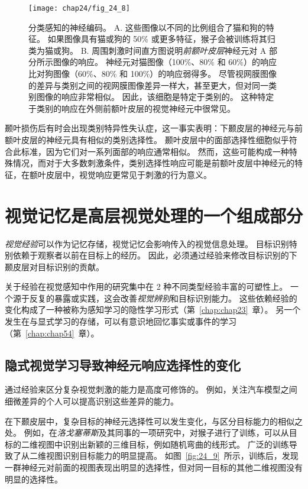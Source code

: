 \begin{figure}[htbp]
	\centering
	\texttt{[image: chap24/fig\_24\_8]}
	\caption{分类感知的神经编码。
		A. 这些图像以不同的比例组合了猫和狗的特征。
		如果图像具有猫或狗的 50\% 或更多特征，猴子会被训练将其归类为猫或狗。
		B. 周围刺激时间直方图说明\textit{前额叶皮层}神经元对 A 部分所示图像的响应。
		神经元对猫图像（100\%、80\% 和 60\%）的响应比对狗图像（60\%、80\% 和 100\%）的响应弱得多。
		尽管视网膜图像的差异与类别之间的视网膜图像差异一样大，甚至更大，但对同一类别图像的响应非常相似。
		因此，该细胞是特定于类别的。
		这种特定于类别的响应在外侧前额叶皮层的视觉神经元中很常见。}
	\label{fig:24_8}
\end{figure}


颞叶损伤后有时会出现类别特异性失认症，这一事实表明：下颞皮层的神经元与前额叶皮层的神经元具有相似的类别选择性。
颞叶皮层中的面部选择性细胞似乎符合此标准，因为它们对一系列面部的响应通常相似。
然而，这些可能构成一种特殊情况，而对于大多数刺激条件，类别选择性响应可能是前额叶皮层中神经元的特征，在额叶皮层中，视觉响应更常见于刺激的行为意义。



\section{视觉记忆是高层视觉处理的一个组成部分}

\textit{视觉经验}可以作为记忆存储，视觉记忆会影响传入的视觉信息处理。
目标识别特别依赖于观察者以前在目标上的经历。
因此，必须通过经验来修改目标识别的下颞皮层对目标识别的贡献。


关于经验在视觉感知中作用的研究集中在 2 种不同类型经验丰富的可塑性上。
一个源于反复的暴露或实践，这会改善\textit{视觉辨别}和目标识别能力。
这些依赖经验的变化构成了一种被称为感知学习的隐性学习形式（第~\ref{chap:chap23}~章）。
另一个发生在与显式学习的存储，可以有意识地回忆事实或事件的学习（第~\ref{chap:chap54}~章）。



\subsection{隐式视觉学习导致神经元响应选择性的变化}

通过经验来区分复杂视觉刺激的能力是高度可修饰的。
例如，关注汽车模型之间细微差异的个人可以提高识别这些差异的能力。


在下颞皮层中，复杂目标的神经元选择性可以发生变化，与区分目标能力的相似之处。
例如，在\textit{洛戈塞蒂斯}及其同事的一项研究中，对猴子进行了训练，可以从目标的二维视图中识别出新颖的三维目标，例如随机弯曲的线形式\cite{logothetis1995psychophysical}。
广泛的训练导致了从二维视图识别目标能力的明显提高。
如图~\ref{fig:24_9}~所示，训练后，发现一群神经元对前面的视图表现出明显的选择性，但对同一目标的其他二维视图没有明显的选择性。


